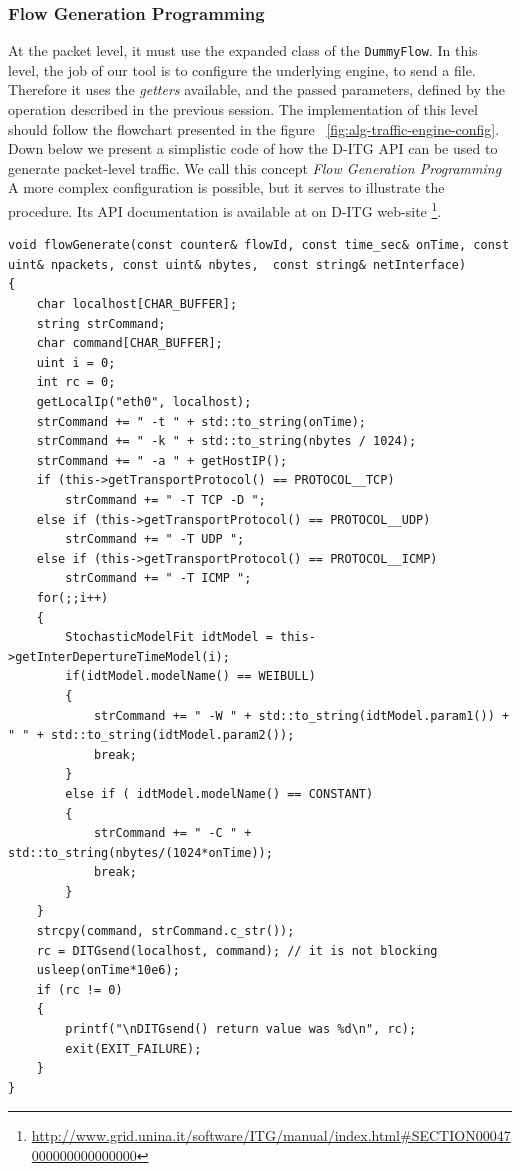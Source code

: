 \subsubsection{Flow Generation Programming}

At the packet level, it must use the expanded class of the \texttt{DummyFlow}. In this level, the job of our tool is to configure the underlying engine, to send a file. Therefore it uses the \textit{getters} available, and the passed parameters, defined by the operation described in the previous session. The implementation of this level should follow the flowchart presented in the figure ~\ref{fig:alg-traffic-engine-config}.
Down below we present a simplistic code of how the D-ITG API can be used to generate packet-level traffic. We call this concept \textit{Flow Generation Programming} A more complex configuration is possible, but it serves to illustrate the procedure. Its API documentation is available at on D-ITG web-site \footnote{\href{http://www.grid.unina.it/software/ITG/manual/index.html\#SECTION00047000000000000000}{http://www.grid.unina.it/software/ITG/manual/index.html\#SECTION00047000000000000000}}. 
\begin{verbatim}
void flowGenerate(const counter& flowId, const time_sec& onTime, const uint& npackets, const uint& nbytes,  const string& netInterface)
{
	char localhost[CHAR_BUFFER];
	string strCommand;
	char command[CHAR_BUFFER];
	uint i = 0;
	int rc = 0;
	getLocalIp("eth0", localhost);
	strCommand += " -t " + std::to_string(onTime); 
	strCommand += " -k " + std::to_string(nbytes / 1024);
	strCommand += " -a " + getHostIP();
	if (this->getTransportProtocol() == PROTOCOL__TCP)
		strCommand += " -T TCP -D ";
	else if (this->getTransportProtocol() == PROTOCOL__UDP)
		strCommand += " -T UDP ";
	else if (this->getTransportProtocol() == PROTOCOL__ICMP)
		strCommand += " -T ICMP ";
	for(;;i++)
	{	
		StochasticModelFit idtModel = this->getInterDepertureTimeModel(i);
		if(idtModel.modelName() == WEIBULL)
		{
			strCommand += " -W " + std::to_string(idtModel.param1()) + " " + std::to_string(idtModel.param2());
			break;
		}
		else if ( idtModel.modelName() == CONSTANT)
		{
			strCommand += " -C " + std::to_string(nbytes/(1024*onTime));
			break;
		}
	}
	strcpy(command, strCommand.c_str());
	rc = DITGsend(localhost, command); // it is not blocking
    usleep(onTime*10e6);
	if (rc != 0)
	{
		printf("\nDITGsend() return value was %d\n", rc);
		exit(EXIT_FAILURE);
	}
}
\end{verbatim}

